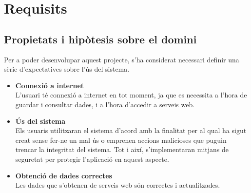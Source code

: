 \chapter{Requisits} %

\label{Requisits} %

\section{Propietats i hipòtesis sobre el domini}

Per a poder desenvolupar aquest projecte, s'ha considerat necessari definir una sèrie d'expectatives sobre l'ús del sistema.
\begin{itemize}
\item{}\textbf{Connexió a internet}\\
L'usuari té connexió a internet en tot moment, ja que es necessita a l'hora
de guardar i consultar dades, i a l'hora d'accedir a serveis web.
\item{}\textbf{Ús del sistema}\\
Els usuaris utilitzaran el sistema d'acord amb la finalitat per al qual ha
sigut creat sense fer-ne un mal ús o emprenen accions malicioses que puguin trencar la integritat del sistema. Tot i així, s'implementaran mitjans de seguretat per protegir l'aplicació en aquest aspecte.
\item{}\textbf{Obtenció de dades correctes}\\
Les dades que s'obtenen de serveis web són
correctes i actualitzades.

\end{itemize}

